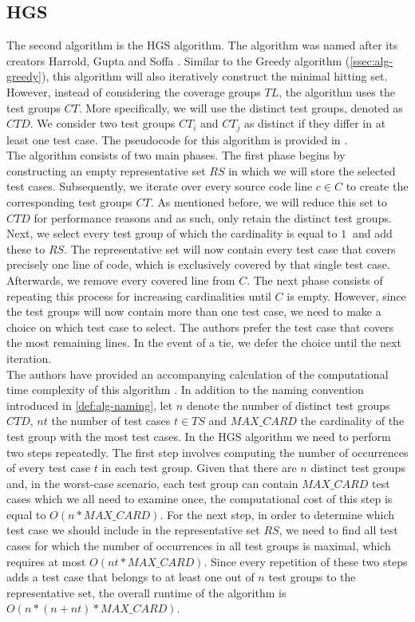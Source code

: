 
\subsection{HGS}\label{ssec:alg-hgs}
The second algorithm is the HGS algorithm. The algorithm was named after its creators Harrold, Gupta and Soffa \cite{hgs}. Similar to the Greedy algorithm (\cref{ssec:alg-greedy}), this algorithm will also iteratively construct the minimal hitting set. However, instead of considering the coverage groups $TL$, the algorithm uses the test groups $CT$. More specifically, we will use the distinct test groups, denoted as $CTD$. We consider two test groups $CT_i$ and $CT_j$ as distinct if they differ in at least one test case. The pseudocode for this algorithm is provided in .\\

\noindent The algorithm consists of two main phases. The first phase begins by constructing an empty representative set $RS$ in which we will store the selected test cases. Subsequently, we iterate over every source code line $c \in C$ to create the corresponding test groups $CT$. As mentioned before, we will reduce this set to $CTD$ for performance reasons and as such, only retain the distinct test groups. Next, we select every test group of which the cardinality is equal to $\SI{1}{}$ and add these to $RS$. The representative set will now contain every test case that covers precisely one line of code, which is exclusively covered by that single test case. Afterwards, we remove every covered line from $C$. The next phase consists of repeating this process for increasing cardinalities until $C$ is empty. However, since the test groups will now contain more than one test case, we need to make a choice on which test case to select. The authors prefer the test case that covers the most remaining lines. In the event of a tie, we defer the choice until the next iteration.\\

\noindent The authors have provided an accompanying calculation of the computational time complexity of this algorithm \cite{hgs}. In addition to the naming convention introduced in \cref{def:alg-naming}, let $n$ denote the number of distinct test groups $CTD$, $nt$ the number of test cases $t \in TS$ and $MAX\_CARD$ the cardinality of the test group with the most test cases. In the HGS algorithm we need to perform two steps repeatedly. The first step involves computing the number of occurrences of every test case $t$ in each test group. Given that there are $n$ distinct test groups and, in the worst-case scenario, each test group can contain $MAX\_CARD$ test cases which we all need to examine once, the computational cost of this step is equal to $O(n * MAX\_CARD)$. For the next step, in order to determine which test case we should include in the representative set $RS$, we need to find all test cases for which the number of occurrences in all test groups is maximal, which requires at most $O(nt * MAX\_CARD)$. Since every repetition of these two steps adds a test case that belongs to at least one out of $n$ test groups to the representative set, the overall runtime of the algorithm is $O(n * (n + nt) * MAX\_CARD)$.

